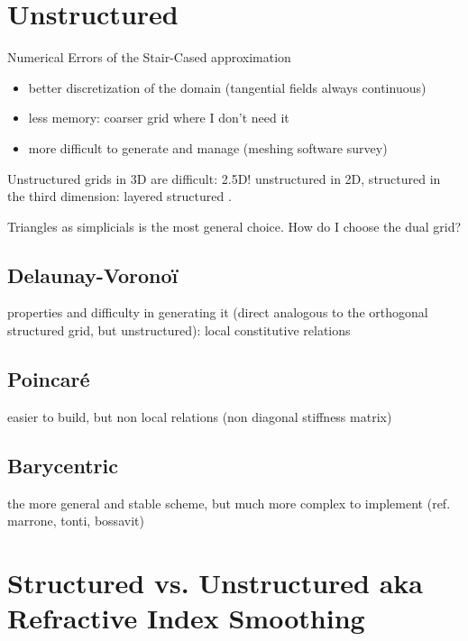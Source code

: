\section{Unstructured}
Numerical Errors of the Stair-Cased approximation
\cite{cangellaris_analysis}

\begin{itemize}
\item
  better discretization of the domain (tangential fields always
  continuous)
\item
  less memory: coarser grid where I don't need it
\item
  more difficult to generate and manage (meshing software survey)
\end{itemize}

Unstructured grids in 3D are difficult: 2.5D! unstructured in 2D,
structured in the third dimension: layered structured
\cite{gedney_parallel}.

Triangles as simplicials is the most general choice. How do I choose
the dual grid?

\subsection{Delaunay-Vorono\"{i}} \label{sec:delaunay_voronoi}
properties and difficulty in generating it (direct analogous to the
orthogonal structured grid, but unstructured): local constitutive
relations

\subsection{Poincar\'e}
easier to build, but non local relations (non diagonal stiffness matrix)

\subsection{Barycentric}
the more general and stable scheme, but much more complex to implement
(ref. marrone, tonti, bossavit)




\section{Structured vs. Unstructured aka Refractive Index Smoothing}
